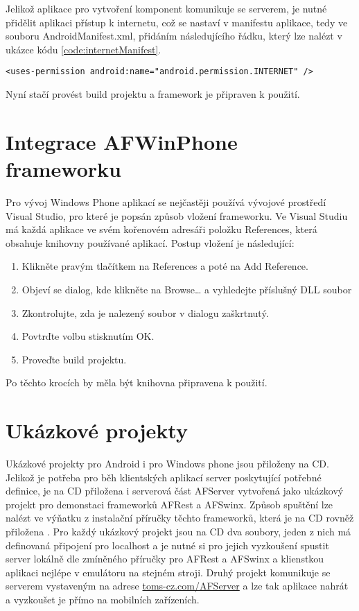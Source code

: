 Jelikož aplikace pro vytvoření komponent komunikuje se serverem, je nutné přidělit aplikaci přístup k internetu, což se nastaví v manifestu aplikace, tedy ve souboru AndroidManifest.xml, přidáním následujícího řádku, který lze nalézt v ukázce kódu \ref{code:internetManifest}.
\begin{lstlisting}[caption={Android manifest - udělení přístupu k internetu},
label={code:internetManifest}, basicstyle=\footnotesize, frame=single]
<uses-permission android:name="android.permission.INTERNET" /> 
\end{lstlisting}

Nyní stačí provést build projektu a framework je připraven k použití.

\section{Integrace AFWinPhone frameworku}
Pro vývoj Windows Phone aplikací se nejčastěji používá vývojové prostředí Visual Studio, pro které je popsán způsob vložení frameworku. Ve Visual Studiu má každá aplikace ve svém kořenovém adresáři položku References, která obsahuje knihovny používané aplikací. Postup vložení je následující:
\begin{enumerate}
\item Klikněte pravým tlačítkem na References a poté na Add Reference.
\item Objeví se dialog, kde klikněte na Browse… a vyhledejte příslušný DLL soubor
\item Zkontrolujte, zda je nalezený soubor v dialogu zaškrtnutý.
\item Povtrďte volbu stisknutím OK.
\item Proveďte build projektu. 
\end{enumerate}
Po těchto krocích by měla být knihovna připravena k použití.

\section{Ukázkové projekty}
Ukázkové projekty pro Android i pro Windows phone jsou přiloženy na CD. Jelikož je potřeba pro běh klientských aplikací server poskytující potřebné definice, je na CD přiložena i serverová část AFServer vytvořená jako ukázkový projekt pro demonstaci frameworků AFRest a AFSwinx. Způsob spuštění lze nalézt ve výňatku z instalační příručky těchto frameworků, která je na CD rovněž přiložena \cite{tomasek-thesis}. Pro každý ukázkový projekt jsou na CD dva soubory, jeden z nich má definovaná připojení pro localhost a je nutné si pro jejich vyzkoušení spustit server lokálně dle zmíněného příručky pro AFRest a AFSwinx a klienstkou aplikaci nejlépe v emulátoru na stejném stroji. Druhý projekt komunikuje se serverem vystaveným na adrese \url{toms-cz.com/AFServer} a lze tak aplikace nahrát a vyzkoušet je přímo na mobilních zařízeních. 
